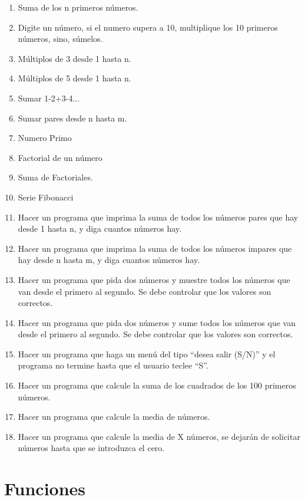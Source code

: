 \documentclass{scrartcl}
\begin{document}
	\begin{enumerate}
		\item Suma de los n primeros números.
		\item Digite un número, si el numero supera a 10, multiplique los 10 primeros números, sino, súmelos.
		\item Múltiplos de 3 desde 1 hasta n.
		\item Múltiplos de 5 desde 1 hasta n.
		\item Sumar 1-2+3-4...
		\item Sumar pares desde n hasta m.
		\item Numero Primo
		\item Factorial de un número
		\item Suma de Factoriales.
		\item Serie Fibonacci
		\item Hacer un programa que imprima la suma de todos los números pares que hay	desde 1 hasta n, y diga cuantos números hay.
		\item Hacer un programa que imprima la suma de todos los números impares que	hay desde n hasta m, y diga cuantos números hay.
		\item Hacer un programa que pida dos números y muestre todos los números que	van desde el primero al segundo. Se debe controlar que los valores son correctos.
		\item Hacer un programa que pida dos números y sume todos los números que van	desde el primero al segundo. Se debe controlar que los valores son correctos.
		\item Hacer un programa que haga un menú del tipo “desea salir (S/N)” y el		programa no termine hasta que el usuario teclee “S”.
		\item Hacer un programa que calcule la suma de los cuadrados de los 100 primeros números.
		\item Hacer un programa que calcule la media de números.
		\item Hacer un programa que calcule la media de X números, se dejarán de solicitar números hasta que se introduzca el cero.
	\end{enumerate}

	\section{Funciones}
	
\end{document}
